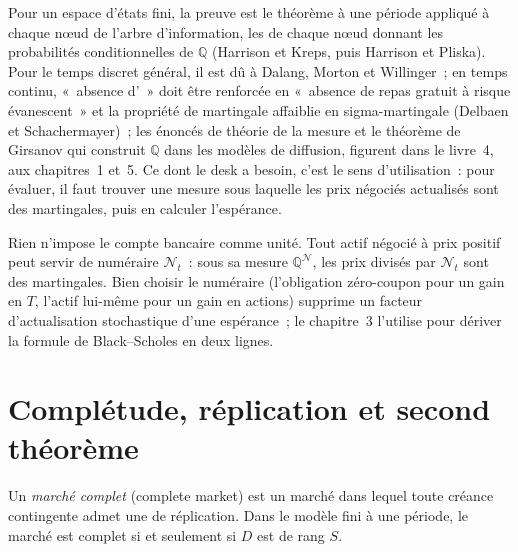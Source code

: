 Pour un espace d'états fini, la preuve est le théorème à une période appliqué à chaque nœud de
l'arbre d'information, les  de chaque nœud donnant les probabilités conditionnelles de
$\mathbb Q$ (Harrison et Kreps, puis Harrison et
Pliska). Pour le temps discret général, il est dû à Dalang, Morton et Willinger~;
en temps continu, «~absence d'~» doit être renforcée en «~absence de repas gratuit
à risque évanescent~» et la propriété de martingale affaiblie en sigma-martingale
(Delbaen et Schachermayer)~; les énoncés de théorie de la mesure et le théorème de Girsanov
qui construit $\mathbb Q$ dans les modèles de diffusion, figurent dans le livre~4,
aux chapitres~1 et~5. Ce dont le desk a besoin, c'est le sens d'utilisation~: pour évaluer, il
faut trouver une mesure sous laquelle les prix négociés actualisés sont des martingales, puis
en calculer l'espérance.

\begin{remark}\label{rem:dv:no-arbitrage-and-the-fundamental-theorems:numeraire}
Rien n'impose le compte bancaire comme unité. Tout actif négocié à prix positif peut servir de
numéraire $\mathcal N_t$~: sous sa mesure $\mathbb Q^{\mathcal N}$, les prix divisés par $\mathcal N_t$
sont des martingales. Bien choisir le numéraire
(l'obligation zéro-coupon pour un gain en $T$, l'actif lui-même pour un gain en
actions) supprime un facteur d'actualisation stochastique d'une espérance~; le chapitre~3 l'utilise pour
dériver la formule de Black--Scholes en deux lignes.
\end{remark}

\section{Complétude, réplication et second théorème}

\begin{definition}\label{def:dv:no-arbitrage-and-the-fundamental-theorems:complete}
Un \emph{marché complet} (complete market) est un marché dans lequel toute
créance contingente admet une  de réplication. Dans le modèle fini à une
période, le marché est complet si et seulement si $D$ est de rang $S$.
\end{definition}

